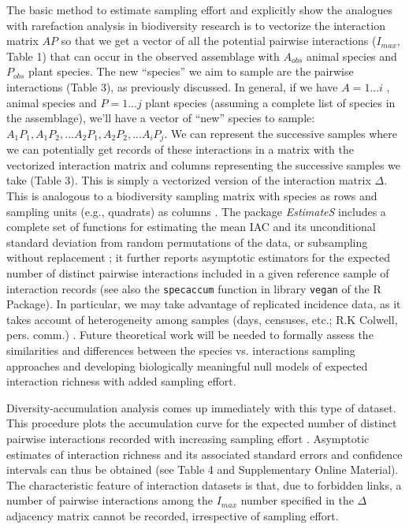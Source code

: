 \documentclass[12pt]{article}
\begin{document}
The basic method to estimate sampling effort and explicitly show the analogues with rarefaction analysis in biodiversity research is to vectorize the interaction matrix $AP$ so that we get a vector of all the potential pairwise interactions ($I_{max}$, Table 1) that can occur in the observed assemblage with $A_{obs}$ animal species and $P_{obs}$ plant species. The new ``species'' we aim to sample are the pairwise interactions (Table 3), as previously discussed. In general, if we have $A= 1... i$ , animal species and $P = 1... j$ plant species (assuming a complete list of species in the assemblage), we'll have a vector of ``new'' species to sample: $A_1P_1, A_1P_2,... A_2P_1, A_2P_2, ... A_iP_j$. We can represent the successive samples where we can potentially get records of these interactions in a matrix with the vectorized interaction matrix and columns representing the successive samples we take (Table 3). This is simply a vectorized version of the interaction matrix $\Delta$. This is analogous to a biodiversity sampling matrix with species as rows and sampling units (e.g., quadrats) as columns \citep{Jordano:2009c}. The package \emph{EstimateS} \citep{Colwell:2013kj} includes a complete set of functions for estimating the mean IAC and its unconditional standard deviation from random permutations of the data, or subsampling without replacement \citep{Gotelli:2001uo}; it further reports asymptotic estimators for the expected number of distinct pairwise interactions included in a given reference sample of interaction records (see also the \texttt{specaccum} function in library \texttt{vegan} of the R Package)\citep{RCoreTeam:2010,Jordano:2009c,Olesen:2011a}. In particular, we may take advantage of replicated incidence data, as it takes account of heterogeneity among samples (days, censuses, etc.; R.K Colwell, pers. comm.) \citep[see also ][]{Colwell:2004fi,Colwell:2012fc,Chao:2014wm}. Future theoretical work will be needed to formally assess the similarities and differences between the species vs. interactions sampling approaches and developing biologically meaningful null models of expected interaction richness with added sampling effort.


Diversity-accumulation analysis \citep{Magurran:1988mm,Hortal:2006dc} comes up immediately with this type of dataset. This procedure plots the accumulation curve for the expected number of distinct pairwise interactions recorded with increasing sampling effort \citep{Jordano:2009c,Olesen:2011a}. Asymptotic estimates of interaction richness and its associated standard errors and confidence intervals can thus be obtained \citep{Hortal:2006dc} (see Table 4 and Supplementary Online Material). The characteristic feature of interaction datasets is that, due to forbidden links, a number of pairwise interactions among the $I_{max}$ number specified in the $\Delta$ adjacency matrix cannot be recorded, irrespective of sampling effort. 
\end{document}

